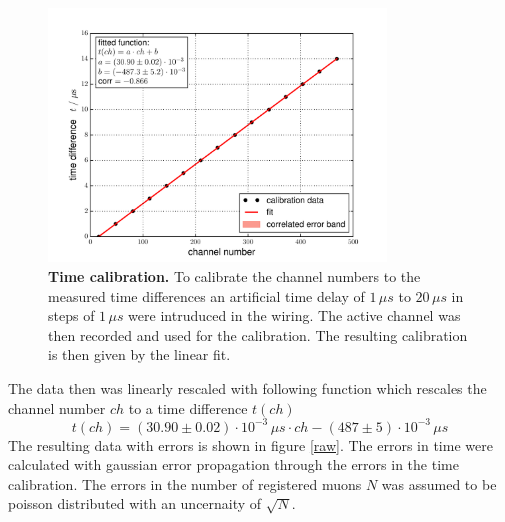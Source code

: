 \documentclass{include/thesisclass3}
\newcommand{\cc}{\cdot}
\newcommand{\e}[1]{\,\si{#1}}
\begin{document}
\begin{figure}[H]
\centering
\includegraphics[width = 0.8\textwidth]{images/cali_fit.pdf}
\caption{\label{time}\textbf{Time calibration.} To calibrate the channel numbers to the measured time differences an artificial time delay of $1\e{\mu s}$ to $20\e{\mu s}$ in steps of $1\e{\mu s}$ were intruduced in the wiring. The active channel was then recorded and used for the calibration. The resulting calibration is then given by the linear fit.}
\end{figure}
The data then was linearly rescaled with following function which rescales the channel number $ch$ to a time difference $t(ch)$
\[ t(ch) = (30.90 \pm 0.02)\cc 10^{-3} \e{\mu s} \cc ch - ( 487 \pm 5) \cc 10^{-3} \e{\mu s}\]
The resulting data with errors is shown in figure \ref{raw}. The errors in time were calculated with gaussian error propagation through the errors in the time calibration. The errors in the number of registered muons $N$ was assumed to be poisson distributed with an uncernaity of $\sqrt{N}$.
\end{document}
